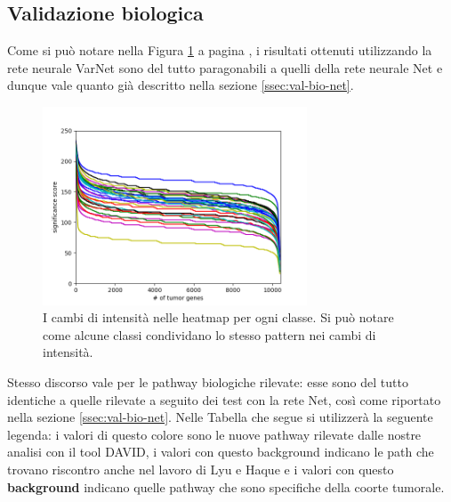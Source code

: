 \subsection{Validazione biologica}
Come si può notare nella Figura \ref{fig:confidence-score-VarNet} a pagina \pageref{fig:confidence-score-VarNet}, 
i risultati ottenuti utilizzando la rete neurale VarNet sono del tutto paragonabili a quelli della rete neurale Net 
e dunque vale quanto già descritto nella sezione \ref{ssec:val-bio-net}.
\begin{figure}
    \centering
    \includegraphics[width=0.7\textwidth]{images/confidence-score/ConfidenceScore-plot-VarNet.png}
    \caption{I cambi di intensità nelle heatmap per ogni classe. Si può notare come alcune classi condividano lo stesso pattern nei cambi di intensità.}
    \label{fig:confidence-score-VarNet}
\end{figure}
Stesso discorso vale per le pathway biologiche rilevate: esse sono del tutto identiche a quelle rilevate a seguito dei
test con la rete Net, così come riportato nella sezione \ref{ssec:val-bio-net}.
Nelle Tabella che segue si utilizzerà la seguente legenda: i valori di questo \textcolor{\clrnew}{colore} sono 
le nuove pathway rilevate dalle nostre analisi con il tool DAVID, i valori con questo \colorbox{\clrmatch}{background}
indicano le path che trovano riscontro anche nel lavoro di Lyu e Haque \cite{lyu2018deep} e i valori con questo
\colorbox{\clrpath}{\textbf{background}} indicano quelle pathway che sono specifiche
della coorte tumorale.

